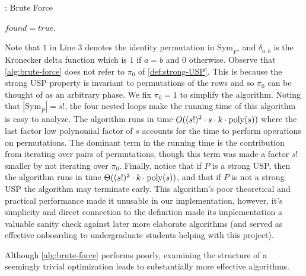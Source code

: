 \documentclass[11pt]{article}
\newcommand\Sym[1]{\ensuremath{\mathrm{Sym}_{#1}}}
\begin{document}
\begin{algorithm}
  \caption{: Brute Force}
  \label{alg:brute-force}
\begin{algorithmic}[1]

  \For{$\pi_1 \in \Sym{P}$}
    \For{$\pi_2 \in \Sym{P}$}
             $found = true$. \EndIf
          \EndFor
        \EndFor
          \EndIf  
      \EndIf
    \EndFor
  \EndFor
\end{algorithmic}
\end{algorithm}
Note that $1$ in Line 3 denotes the identity permutation in $\Sym{P}$,
and $\delta_{a,b}$ is the Kronecker delta function which is $1$ if $a
= b$ and $0$ otherwise.  Observe that \autoref{alg:brute-force} does
not refer to $\pi_0$ of \autoref{def:strong-USP}.  This is because the
strong USP property is invariant to permutations of the rows and so
$\pi_0$ can be thought of as an arbitrary phase.  We fix $\pi_0 = 1$
to simplify the algorithm.  Noting that $|\Sym{P}| = s!$, the four
nested loops make the running time of this algorithm is easy to
analyze.  The algorithm runs in time $O((s!)^2 \cdot s \cdot k \cdot
\operatorname{poly}(s))$ where the last factor low polynomial factor of $s$ accounts
for the time to perform operations on permutations.  The dominant term
in the running time is the contribution from iterating over pairs of
permutations, though this term was made a factor $s!$ smaller by not
iterating over $\pi_0$.  Finally, notice that if $P$ is a strong USP,
then the algorithm runs in time $\Theta((s!)^2 \cdot k \cdot
\operatorname{poly}(s))$, and that if $P$ is not a strong USP the algorithm may
terminate early.  This algorithm's poor theoretical and practical
performance made it unusable in our implementation, however, it's
simplicity and direct connection to the definition made its
implementation a valuable sanity check against later more elaborate
algorithms (and served as effective onboarding to undergraduate
students helping with this project).

Although \autoref{alg:brute-force} performs poorly, examining the
structure of a seemingly trivial optimization leads to substantially
more effective algorithms.
\end{document}
